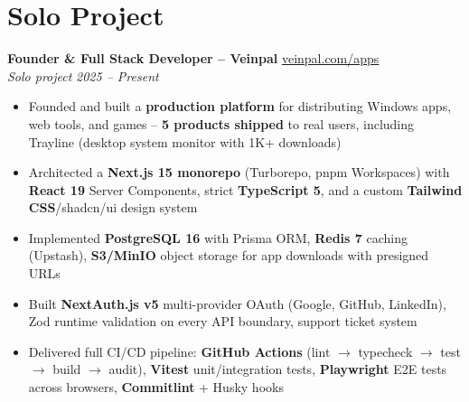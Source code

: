 \documentclass[10pt,a4paper]{article}
\begin{document}
\section*{Solo Project}
{\small
\textbf{Founder \& Full Stack Developer -- Veinpal} \hfill \href{https://veinpal.com/apps}{veinpal.com/apps}\\[1pt]
\textit{Solo project} \hfill \textit{2025 -- Present}
\begin{itemize}
  \item Founded and built a \textbf{production platform} for distributing Windows apps, web tools, and games -- \textbf{5 products shipped} to real users, including Trayline (desktop system monitor with 1K+ downloads)
  \item Architected a \textbf{Next.js 15 monorepo} (Turborepo, pnpm Workspaces) with \textbf{React 19} Server Components, strict \textbf{TypeScript 5}, and a custom \textbf{Tailwind CSS}/shadcn/ui design system
  \item Implemented \textbf{PostgreSQL 16} with Prisma ORM, \textbf{Redis 7} caching (Upstash), \textbf{S3/MinIO} object storage for app downloads with presigned URLs
  \item Built \textbf{NextAuth.js v5} multi-provider OAuth (Google, GitHub, LinkedIn), Zod runtime validation on every API boundary, support ticket system
  \item Delivered full CI/CD pipeline: \textbf{GitHub Actions} (lint $\rightarrow$ typecheck $\rightarrow$ test $\rightarrow$ build $\rightarrow$ audit), \textbf{Vitest} unit/integration tests, \textbf{Playwright} E2E tests across browsers, \textbf{Commitlint} + Husky hooks
\end{itemize}
}

\end{document}
